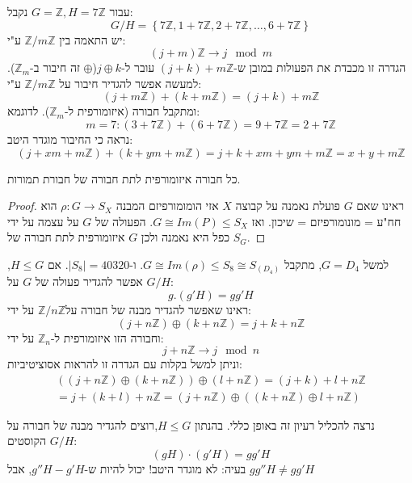 \documentclass{tstextbook}
\begin{document}
\begin{example}
עבור \(G=\mathbb{Z} ,H=7\mathbb{Z}\) נקבל:
$$G/H=\left\{  7\mathbb{Z} , 1+7\mathbb{Z} ,2+7\mathbb{Z} ,\dots,6+7\mathbb{Z}\right\}$$
יש התאמה בין \(\mathbb{Z} /m\mathbb{Z}\) ע"י:
$$(j+m)\mathbb{Z} \to j\mod m$$
הגדרה זו מכבדת את הפעולות במובן ש-\((j+k)+m\mathbb{Z}\) עובר ל-\(j\oplus k\)(\(\oplus\) זה חיבור ב-\(\mathbb{Z}_{m}\)). למעשה אפשר להגדיר חיבור על \(\mathbb{Z} /m\mathbb{Z}\) ע"י:
$$\left( j+m\mathbb{Z}  \right)+\left( k+m\mathbb{Z}  \right)=(j+k)+m\mathbb{Z}$$
ומתקבל חבורה (איזומורפית ל-\(\mathbb{Z} _m\)). לדוגמא:
$$m=7: \left( 3+7\mathbb{Z}  \right)+\left( 6+7\mathbb{Z}  \right)=9+7\mathbb{Z} =2+7\mathbb{Z}$$
נראה כי החיבור מוגדר היטב:
$$\left( j+xm+m\mathbb{Z}  \right)+\left( k+ym+m\mathbb{Z}  \right)=j+k+xm+ym+m\mathbb{Z} =x+y+m\mathbb{Z}$$

\end{example}
\begin{proposition}
כל חבורה איזומורפית לתת חבורה של חבורת תמורות.

\end{proposition}
\begin{proof}
ראינו שאם \(G\) פועלת נאמנה על קבוצה \(X\) אזי הומומורפיזם המבנה \(\rho:G\to S_{X}\) הוא חח"ע = מונומורפיזם = שיכון. ואז \(G\cong Im(P)\leq S_{X}\). הפעולה של \(G\) על עצמה על ידי כפל היא נאמנה ולכן \(G\) איזומורפית לתת חבורה של \(S_{G}\).

\end{proof}
\begin{example}
למשל \(G=D_{4}\), מתקבל \(G\cong Im\left( \rho \right)\leq S_{8}\cong S_{(D_{4})}\). ו-\(|S_{8}|=40320\). אם \(H\leq G\), אפשר להגדיר פעולה של \(G\) על \(G/H\):
$$g.(g'H)=gg'H$$
ראינו שאפשר להגדיר מבנה של חבורה על\(\mathbb{Z} /n\mathbb{Z}\) על ידי:
$$\left( j+n\mathbb{Z} \right) \oplus\left( k+n\mathbb{Z}  \right)=j+k+n\mathbb{Z}$$
וחבורה הזו איזומורפית ל-\(\mathbb{Z} _n\) על ידי:
$$j+n\mathbb{Z} \to j \mod n$$
וניתן למשל בקלות עם הגדרה זו להראות אסוציטיביות: 
$$\begin{gathered}\left( \left( j+n\mathbb{Z}  \right)\oplus\left( k+n\mathbb{Z}  \right) \right)\oplus\left( l+n\mathbb{Z}  \right)=(j+k)+l+n\mathbb{Z} \\=j+(k+l)+n\mathbb{Z}  = \left( j+n\mathbb{Z}  \right)\oplus\left( \left( k+n\mathbb{Z}  \right)\oplus l+n\mathbb{Z}  \right)
\end{gathered}$$

\end{example}
נרצה להכליל רעיון זה באופן כללי. בהנתון \(H\leq G\),רוצים להגדיר מבנה של חבורה על הקוסטים \(G/H\): 
$$(gH)\cdot  (g'H)=gg'H$$
בעיה: לא מוגדר היטב! יכול להיות ש-\(g''H-g'H\), אבל \(gg''H\neq gg'H\)
\end{document}

